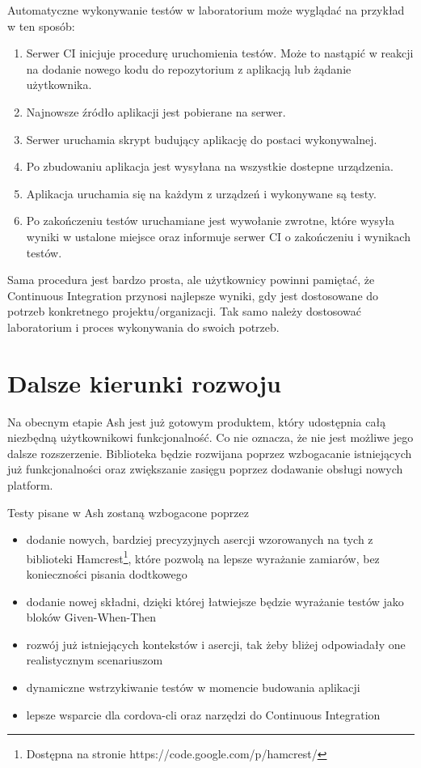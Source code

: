\documentclass[brudnopis]{xmgr}
\begin{document}
Automatyczne wykonywanie testów w laboratorium może wyglądać na przykład w ten sposób:

\begin{enumerate}
  \item Serwer CI inicjuje procedurę uruchomienia testów. Może to nastąpić w reakcji na dodanie nowego kodu do repozytorium z aplikacją lub żądanie użytkownika.
  \item Najnowsze źródło aplikacji jest pobierane na serwer.
  \item Serwer uruchamia skrypt budujący aplikację do postaci wykonywalnej.
  \item Po zbudowaniu aplikacja jest wysyłana na wszystkie dostepne urządzenia.
  \item Aplikacja uruchamia się na każdym z urządzeń i wykonywane są testy.
  \item Po zakończeniu testów uruchamiane jest wywołanie zwrotne, które wysyła wyniki w ustalone miejsce oraz informuje serwer CI o zakończeniu i wynikach testów.
\end{enumerate}

Sama procedura jest bardzo prosta, ale użytkownicy powinni pamiętać, że Continuous Integration przynosi najlepsze wyniki, gdy jest dostosowane do potrzeb konkretnego projektu/organizacji. Tak samo należy dostosować laboratorium i proces wykonywania do swoich potrzeb. 

\chapter{Dalsze kierunki rozwoju}

Na obecnym etapie Ash jest już gotowym produktem, który udostępnia całą niezbędną użytkownikowi funkcjonalność. Co nie oznacza, że nie jest możliwe jego dalsze rozszerzenie. Biblioteka będzie rozwijana poprzez wzbogacanie istniejących już funkcjonalności oraz zwiększanie zasięgu poprzez dodawanie obsługi nowych platform. 

Testy pisane w Ash zostaną wzbogacone poprzez

\begin{itemize}
  \item dodanie nowych, bardziej precyzyjnych asercji wzorowanych na tych z biblioteki Hamcrest\footnote{Dostępna na stronie https://code.google.com/p/hamcrest/}, które pozwolą na lepsze wyrażanie zamiarów, bez konieczności pisania dodtkowego
  \item dodanie nowej składni, dzięki której łatwiejsze będzie wyrażanie testów jako bloków Given-When-Then
  \item rozwój już istniejących kontekstów i asercji, tak żeby bliżej odpowiadały one realistycznym scenariuszom 
  \item dynamiczne wstrzykiwanie testów w momencie budowania aplikacji
  \item lepsze wsparcie dla cordova-cli oraz narzędzi do Continuous Integration
\end{itemize}
\end{document}
